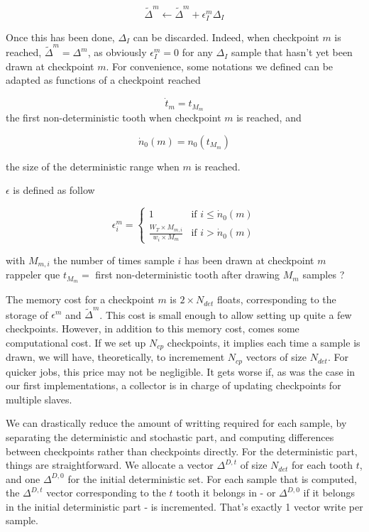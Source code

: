 \documentclass[./thesis.tex]{subfiles}
\begin{document}
\begin{equation}
\tilde \Delta^m \gets \tilde \Delta^m + \epsilon_I^{m} \Delta_I
\end{equation}


Once this has been done, $\Delta_I$ can be discarded. Indeed, when checkpoint $m$ is reached, $\tilde \Delta^m = \Delta^{m}$, as obviously $\epsilon_I^{m} = 0$ for any $\Delta_I$ sample that hasn't yet been drawn at checkpoint ${m}$.
For convenience, some notations we defined can be adapted as functions of a checkpoint reached

\begin{equation}
\dot t_m = t_{M_m}
\end{equation}
the first non-deterministic tooth when checkpoint $m$ is reached, and

\begin{equation}
\dot n_0(m) = n_0(t_{M_m})
\end{equation}

the size of the deterministic range when $m$ is reached.


$\epsilon$ is defined as follow

\begin{equation}
\epsilon^m_i = 
\begin{cases}
1 & \text{if } i \leq \dot n_0(m) \\
\frac{W_T \times M_{m,i}}{w_i \times M_m} & \text{if } i > \dot n_0(m)
\end{cases}
\end{equation}


with $M_{m,i}$ the number of times sample $i$ has been drawn at checkpoint $m$ \alert{ rappeler que $t_{M_m}=$  first non-deterministic tooth after drawing $M_m$ samples ?}


The memory cost for a checkpoint $m$ is $2 \times N_{det}$ floats, corresponding to the storage of $\epsilon^m$ and $\tilde \Delta^m$. This cost is small enough to allow setting up quite a few checkpoints. However, in addition to this memory cost, comes some computational cost. If we set up $N_{cp}$ checkpoints, it implies each time a sample is drawn, we will have, theoretically, to incremement $N_{cp}$ vectors of size $N_{det}$. For quicker jobs, this price may not be negligible. It gets worse if, as was the case in our first implementations, a collector is in charge of updating checkpoints for multiple slaves. 


We can drastically reduce the amount of writting required for each sample, by separating the deterministic and stochastic part, and computing differences between checkpoints rather than checkpoints directly.
For the deterministic part, things are straightforward. We allocate a vector $\Delta^{D,t}$ of size $N_{det}$ for each tooth $t$, and one $\Delta^{D,0}$ for the initial deterministic set. For each sample that is computed, the $\Delta^{D,t}$ vector corresponding to the $t$ tooth it belongs in - or $\Delta^{D,0}$ if it belongs in the initial deterministic part - is incremented. That's exactly 1 vector write per sample.
\end{document}
